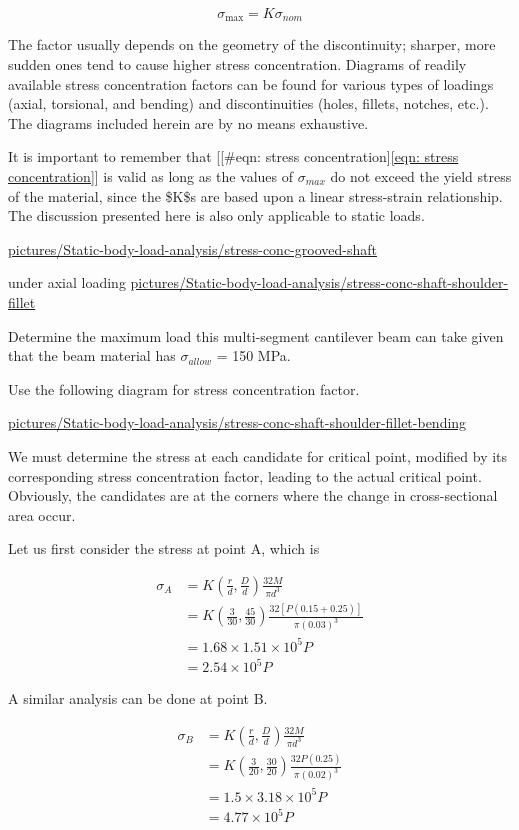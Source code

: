 \documentclass[a4paper,openany,12pt]{book}
\begin{document}
$$\sigma _{\max } = K\sigma _{nom}$$

The factor usually depends on the geometry of the discontinuity;
sharper, more sudden ones tend to cause higher stress concentration.
Diagrams of readily available stress concentration factors can be found
for various types of loadings (axial, torsional, and bending) and
discontinuities (holes, fillets, notches, etc.). The diagrams included
herein are by no means exhaustive.

It is important to remember that
[[\#eqn: stress concentration]\ref{eqn: stress concentration}] is valid as
long as the values of \(\sigma_{max}\) do not exceed the yield stress of
the material, since the \$K\$s are based upon a linear stress-strain
relationship. The discussion presented here is also only applicable to
static loads.


\cite{juvinall2006fundamentals}
\url{pictures/Static-body-load-analysis/stress-conc-grooved-shaft}


under axial loading \cite{juvinall2006fundamentals}
\url{pictures/Static-body-load-analysis/stress-conc-shaft-shoulder-fillet}

Determine the maximum load this multi-segment cantilever beam can take
given that the beam material has \(\sigma_{allow}\) = 150 MPa.


Use the following diagram for stress concentration factor.


\url{pictures/Static-body-load-analysis/stress-conc-shaft-shoulder-fillet-bending}

We must determine the stress at each candidate for critical point,
modified by its corresponding stress concentration factor, leading to
the actual critical point. Obviously, the candidates are at the corners
where the change in cross-sectional area occur.

Let us first consider the stress at point A, which is

$$\begin{aligned}
    \sigma_A &= K(\frac{r}{d}, \frac{D}{d}) \frac{32M}{\pi d^3} \\
             &= K(\frac{3}{30}, \frac{45}{30}) \frac{32[P(0.15 + 0.25)]}{\pi (0.03)^3} \\
             &= 1.68 \times 1.51 \times 10^5 P \\
             &= 2.54 \times 10^5 P
  \end{aligned}$$

A similar analysis can be done at point B.

$$\begin{aligned}
    \sigma_B &= K(\frac{r}{d}, \frac{D}{d}) \frac{32M}{\pi d^3} \\
             &= K(\frac{3}{20}, \frac{30}{20}) \frac{32P(0.25)}{\pi (0.02)^3} \\
             &= 1.5 \times 3.18 \times 10^5 P \\
             &= 4.77 \times 10^5 P
  \end{aligned}$$
\end{document}
